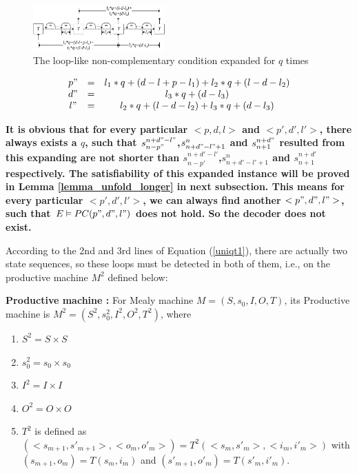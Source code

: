 \documentclass[journal]{IEEEtran}
\begin{document}
\begin{figure}[b]
\begin{center}
\includegraphics[width=0.45\textwidth]{doubleloop_unfold}
\end{center}
\caption{The loop-like non-complementary condition expanded for $q$ times}
  \label{fig_double_loop_unfold}
\end{figure}

\begin{equation}
\begin{array}{ccc}
p"&=&l_1*q+(d-l+p-l_1)+l_2*q+(l-d-l_2) \\
d"&=&l_3*q+(d-l_3) \\
l"&=&l_2*q+(l-d-l_2)+l_3*q+(d-l_3)
\end{array}
\end{equation}

\textbf{It is obvious that for every particular $<p,d,l>$ and $<p',d',l'>$,
there always exists a $q$,
such that $s_{n-p"}^{n+d"-l"}$,$s_{n+d"-l"+1}^n$ and $s_{n+1}^{n+d"}$ resulted from this expanding
are not shorter than $s_{n-p'}^{n+d'-l'}$,$s_{n+d'-l'+1}^n$ and $s_{n+1}^{n+d'}$ respectively.
The satisfiability of this expanded instance will be proved in Lemma \ref{lemma_unfold_longer} in next subsection.
This means for every particular $<p',d',l'>$,
we can always find another $<p",d",l">$,
such that $E\vDash PC(p",d",l")$ does not hold.
So the decoder does not exist.}



According to the 2nd and 3rd lines of Equation (\ref{uniqt1}),
there are actually two state sequences,
so these loops must be detected in both of them,
i.e.,
on the productive machine $M^2$ defined below:

\begin{definition11}%
\textbf{Productive machine :}
For Mealy machine $M=(S,s_0,I,O,T)$,
its Productive machine is $M^2=(S^2,s_0^2,I^2,O^2,T^2)$,
where
\begin{enumerate}
  \item $S^2=S\times S$
  \item $s_0^2=s_0\times s_0$
  \item $I^2=I\times I$
  \item $O^2=O\times O$
  \item $T^2$ is defined as $(<s_{m+1},s'_{m+1}>,<o_m,o'_m>)=T^2(<s_m,s'_m>,<i_m,i'_m>)$ with $(s_{m+1},o_m)=T(s_m,i_m)$ and $(s'_{m+1},o'_m)=T(s'_m,i'_m)$.
\end{enumerate}
\end{definition11}
\end{document}
